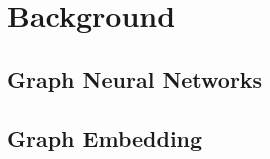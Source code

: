 \section{Background}\label{background}

\subsection{Graph Neural Networks}


\subsection{Graph Embedding}
